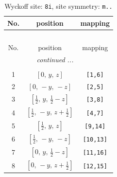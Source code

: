 \documentclass[fleqn,8pt]{jsarticle}
\begin{document}
\begin{longtable}{ccc}
\caption{Wyckoff site: {\tt 8i}, site symmetry: {\tt m..}}
 \\
 \hline \hline
No. & position & mapping \\ \hline \endfirsthead

\multicolumn{2}{l}{\tablename\ \thetable{}} \\
 \hline \hline
No. & position & mapping \\ \hline \endhead

 \hline \hline
\multicolumn{2}{r}{\footnotesize\it continued ...} \\ \endfoot

 \hline \hline
\multicolumn{2}{r}{} \\ \endlastfoot

1 & $\left[ 0,\, y,\, z \right]$ & {\tt [1,6]} \\ \hline
2 & $\left[ 0,\, - y,\, - z \right]$ & {\tt [2,5]} \\ \hline
3 & $\left[ \frac{1}{2},\, y,\, \frac{1}{2} - z \right]$ & {\tt [3,8]} \\ \hline
4 & $\left[ \frac{1}{2},\, - y,\, z + \frac{1}{2} \right]$ & {\tt [4,7]} \\ \hline
5 & $\left[ \frac{1}{2},\, y,\, z \right]$ & {\tt [9,14]} \\ \hline
6 & $\left[ \frac{1}{2},\, - y,\, - z \right]$ & {\tt [10,13]} \\ \hline
7 & $\left[ 0,\, y,\, \frac{1}{2} - z \right]$ & {\tt [11,16]} \\ \hline
8 & $\left[ 0,\, - y,\, z + \frac{1}{2} \right]$ & {\tt [12,15]} \\
\end{longtable}
\renewcommand{\arraystretch}{1.2}
\end{document}
